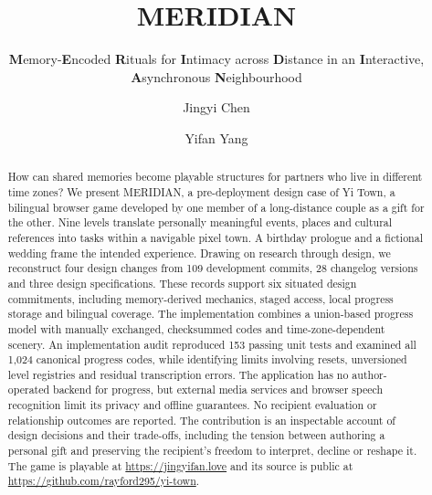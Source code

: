 \documentclass[sigconf,nonacm]{acmart}
\DeclareRobustCommand{\redheart}{\usebox{\heartbox}}
\DeclareRobustCommand{\ini}[1]{\textcolor{merred}{\textbf{#1}}}
\begin{document}
\title[MERIDIAN]{\texorpdfstring{\textcolor{merred}{MERIDIAN}\hspace{0.18em}\redheart}{MERIDIAN}}
\subtitle{\ini{M}emory-\ini{E}ncoded \ini{R}ituals for \ini{I}ntimacy across \ini{D}istance
in an \ini{I}nteractive, \ini{A}synchronous \ini{N}eighbourhood}

\author{Jingyi Chen}

\author{Yifan Yang}

\renewcommand{\shortauthors}{J. Chen and Y. Yang}


\begin{abstract}
How can shared memories become playable structures for partners who live in different time zones?
We present MERIDIAN, a pre-deployment design case of Yi Town, a bilingual browser game developed
by one member of a long-distance couple as a gift for the other. Nine levels translate personally
meaningful events, places and cultural references into tasks within a navigable pixel town.
A birthday prologue and a fictional wedding frame the intended experience. Drawing on research
through design, we reconstruct four design changes from 109 development commits, 28 changelog
versions and three design specifications. These records support six situated design commitments,
including memory-derived mechanics, staged access, local progress storage and bilingual coverage.
The implementation combines a union-based progress model with manually exchanged, checksummed
codes and time-zone-dependent scenery. An implementation audit reproduced 153 passing unit tests
and examined all 1,024 canonical progress codes, while identifying limits involving resets,
unversioned level registries and residual transcription errors. The application has no
author-operated backend for progress, but external media services and browser speech recognition
limit its privacy and offline guarantees. No recipient evaluation or relationship outcomes are
reported. The contribution is an inspectable account of design decisions and their trade-offs,
including the tension between authoring a personal gift and preserving the recipient's freedom
to interpret, decline or reshape it. The game is playable at \url{https://jingyifan.love} and its
source is public at \url{https://github.com/rayford295/yi-town}.

\end{abstract}
\end{document}
